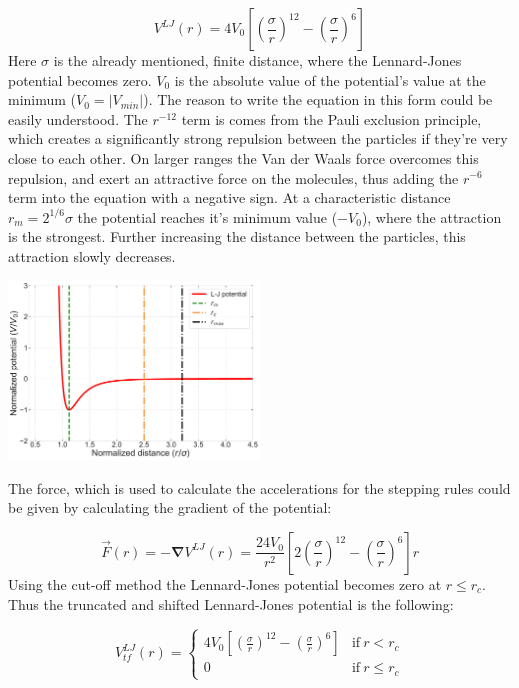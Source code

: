 \begin{multicols}{2}
\begin{equation}
V^{LJ} \left( r \right)
=
4 V_{0} \left[ \left( \frac{\sigma}{r} \right)^{12} - \left( \frac{\sigma}{r} \right)^{6} \right]
\end{equation}
Here $\sigma$ is the already mentioned, finite distance, where the Lennard-Jones potential becomes zero. $V_{0}$ is the absolute value of the potential's value at the minimum ($V_{0} = \left| V_{min} \right|$). The reason to write the equation in this form could be easily understood. The $r^{-12}$ term is comes from the Pauli exclusion principle, which creates a significantly strong repulsion between the particles if they're very close to each other. On larger ranges the Van der Waals force overcomes this repulsion, and exert an attractive force on the molecules, thus adding the $r^{-6}$ term into the equation with a negative sign. At a characteristic distance $r_{m} = 2^{1/6} \sigma$ the potential reaches it's minimum value ($-V_{0}$), where the attraction is the strongest. Further increasing the distance between the particles, this attraction slowly decreases. \par
\begin{center}
	\includegraphics[width=0.5\textwidth]{img_src/Lennard_Jones_Potential.pdf}
	 \label{fig:2}
\end{center}
The force, which is used to calculate the accelerations for the stepping rules could be given by calculating the gradient of the potential:

\begin{equation}
\vec{F} \left( r \right)
=
-\boldsymbol{\nabla} V^{LJ} \left( r \right)
=
\frac{24 V_{0}}{r^{2}} \left[ 2 \left( \frac{\sigma}{r} \right)^{12} - \left( \frac{\sigma}{r} \right)^{6} \right] r
\end{equation}
Using the cut-off method the Lennard-Jones potential becomes zero at $r \leq r_{c}$. Thus the truncated and shifted Lennard-Jones potential is the following:

\begin{equation}
V_{tf}^{LJ} \left( r \right)
=
\begin{cases}
4 V_{0} \left[ \left( \frac{\sigma}{r} \right)^{12} - \left( \frac{\sigma}{r} \right)^{6} \right] & \text{if}\ r < r_{c} \\
0 & \text{if}\ r \leq r_{c}
\end{cases}
\end{equation}

\end{multicols}